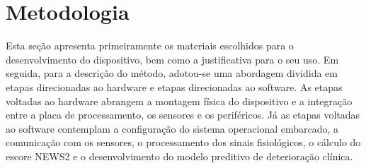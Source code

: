 \section{Metodologia}
\label{Metodologia}



Esta seção apresenta primeiramente os materiais escolhidos para o desenvolvimento do dispositivo, bem como a justificativa para o seu uso. Em seguida, para a descrição do método, adotou-se uma abordagem dividida em etapas direcionadas ao hardware e etapas direcionadas ao software. As etapas voltadas ao hardware abrangem a montagem física do dispositivo e a integração entre a placa de processamento, os sensores e os periféricos. Já as etapas voltadas ao software contemplam a configuração do sistema operacional embarcado, a comunicação com os sensores, o processamento dos sinais fisiológicos, o cálculo do escore NEWS2 e o desenvolvimento do modelo preditivo de deterioração clínica.


% 
% 
% 
% 
% 
% 

